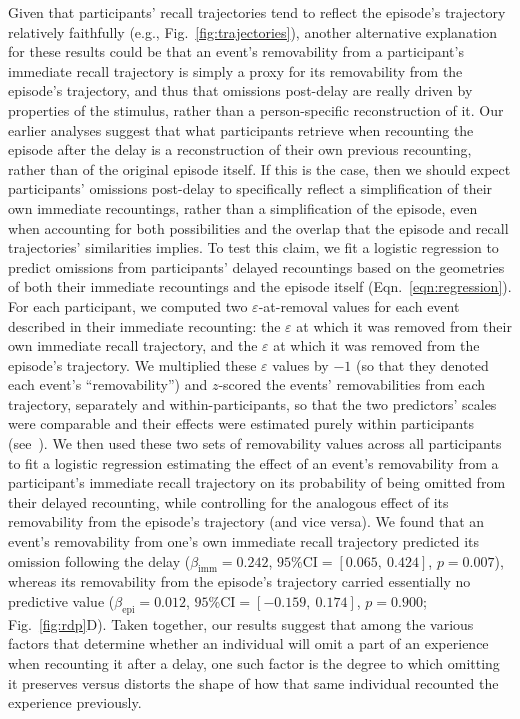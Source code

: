 \documentclass[10pt]{article}
\renewcommand{\nameref}[1]{\textit{\oldnameref{#1}}}
\begin{document}
Given that participants' recall trajectories tend to reflect the episode's trajectory relatively faithfully (e.g., Fig.~\ref{fig:trajectories}), another alternative explanation for these results could be that an event's removability from a participant's immediate recall trajectory is simply a proxy for its removability from the episode's trajectory, and thus that omissions post-delay are really driven by properties of the stimulus, rather than a person-specific reconstruction of it.
Our earlier analyses suggest that what participants retrieve when recounting the episode after the delay is a reconstruction of their own previous recounting, rather than of the original episode itself.
If this is the case, then we should expect participants' omissions post-delay to specifically reflect a simplification of their own immediate recountings, rather than a simplification of the episode, even when accounting for both possibilities and the overlap that the episode and recall trajectories' similarities implies.
To test this claim, we fit a logistic regression to predict omissions from participants' delayed recountings based on the geometries of both their immediate recountings and the episode itself (Eqn.~\ref{eqn:regression}).
For each participant, we computed two $\varepsilon$-at-removal values for each event described in their immediate recounting: the $\varepsilon$ at which it was removed from their own immediate recall trajectory, and the $\varepsilon$ at which it was removed from the episode's trajectory.
We multiplied these $\varepsilon$ values by $-1$ (so that they denoted each event's ``removability'') and $z$-scored the events' removabilities from each trajectory, separately and within-participants, so that the two predictors' scales were comparable and their effects were estimated purely within participants (see~\nameref{subsec:rdp}).
We then used these two sets of removability values across all participants to fit a logistic regression estimating the effect of an event's removability from a participant's immediate recall trajectory on its probability of being omitted from their delayed recounting, while controlling for the analogous effect of its removability from the episode's trajectory (and vice versa).
We found that an event's removability from one's own immediate recall trajectory predicted its omission following the delay ($\beta_{\text{imm}} = 0.242$, $\text{95\% CI} = \left[0.065,~0.424\right]$, $p = 0.007$), whereas its removability from the episode's trajectory carried essentially no predictive value ($\beta_{\text{epi}} = 0.012$, $\text{95\% CI} = \left[-0.159,~0.174\right]$, $p = 0.900$; Fig.~\ref{fig:rdp}D).
Taken together, our results suggest that among the various factors that determine whether an individual will omit a part of an experience when recounting it after a delay, one such factor is the degree to which omitting it preserves versus distorts the shape of how that same individual recounted the experience previously.
\end{document}
